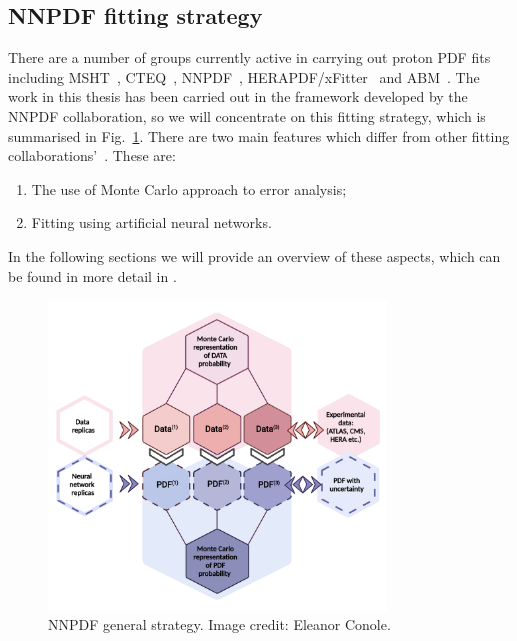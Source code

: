 \subsection{NNPDF fitting strategy}

There are a number of groups currently active in carrying out proton PDF fits including MSHT~\cite{Bailey:2020ooq}, CTEQ~\cite{Hou:2019efy}, NNPDF~\cite{nnpdf}, HERAPDF/xFitter~\cite{CooperSarkar:2011aa} and ABM~\cite{Alekhin:2019ntu}. The work in this thesis has been carried out in the framework developed by the NNPDF collaboration, so we will concentrate on this fitting strategy, which is summarised in Fig.~\ref{fig:generalstrategy}. There are two main features which differ from other fitting collaborations'~\cite{Forte:2002fg}. These are:
\begin{enumerate}
\item  The use of Monte Carlo approach to error analysis;
    \item  Fitting using artificial neural networks.
\end{enumerate}

In the following sections we will provide an overview of these aspects, which can be found in more detail in \cite{Ball:2010de, Ball:2012cx, Ball:2017nwa}.

\begin{figure}[H]
\centering
\includegraphics[width=0.8\textwidth]{background/eleanor_strategy.pdf}
\caption{NNPDF general strategy. Image credit: Eleanor Conole.}
\label{fig:generalstrategy}
\end{figure}

